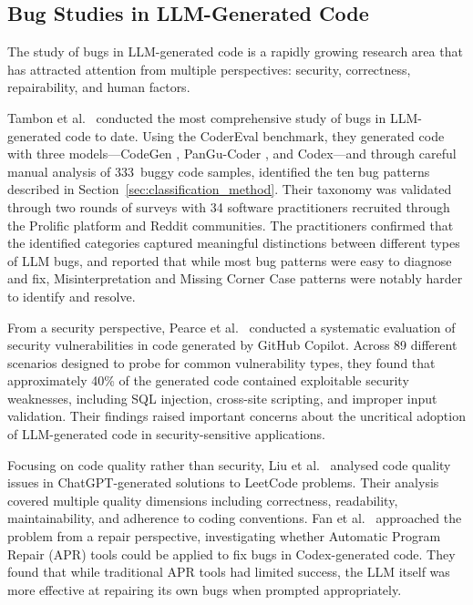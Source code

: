 \documentclass[smallextended]{svjour3}
\begin{document}
\subsection{Bug Studies in LLM-Generated Code}

The study of bugs in LLM-generated code is a rapidly growing research area that has attracted attention from multiple perspectives: security, correctness, repairability, and human factors.

Tambon et al.\ \citep{tambon2025bugs} conducted the most comprehensive study of bugs in LLM-generated code to date. Using the CoderEval benchmark, they generated code with three models---CodeGen \citep{nijkamp2023codegen}, PanGu-Coder \citep{christopoulou2022pangu}, and Codex---and through careful manual analysis of 333~buggy code samples, identified the ten bug patterns described in Section~\ref{sec:classification_method}. Their taxonomy was validated through two rounds of surveys with 34 software practitioners recruited through the Prolific platform and Reddit communities. The practitioners confirmed that the identified categories captured meaningful distinctions between different types of LLM bugs, and reported that while most bug patterns were easy to diagnose and fix, Misinterpretation and Missing Corner Case patterns were notably harder to identify and resolve.

From a security perspective, Pearce et al.\ \citep{pearce2022examining} conducted a systematic evaluation of security vulnerabilities in code generated by GitHub Copilot. Across 89 different scenarios designed to probe for common vulnerability types, they found that approximately 40\% of the generated code contained exploitable security weaknesses, including SQL injection, cross-site scripting, and improper input validation. Their findings raised important concerns about the uncritical adoption of LLM-generated code in security-sensitive applications.

Focusing on code quality rather than security, Liu et al.\ \citep{liu2023chatgpt} analysed code quality issues in ChatGPT-generated solutions to LeetCode problems. Their analysis covered multiple quality dimensions including correctness, readability, maintainability, and adherence to coding conventions. Fan et al.\ \citep{fan2023automated} approached the problem from a repair perspective, investigating whether Automatic Program Repair (APR) tools could be applied to fix bugs in Codex-generated code. They found that while traditional APR tools had limited success, the LLM itself was more effective at repairing its own bugs when prompted appropriately.
\end{document}
